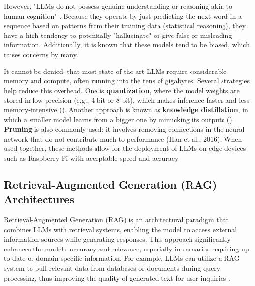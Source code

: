 However, "LLMs do not possess genuine understanding or reasoning akin to human cognition" \cite{li_survey_2024}. Because they operate by just predicting the next word in a sequence based on patterns from their training data (statistical reasoning), they have a high tendency to potentially "hallucinate" or give false or misleading information. Additionally, it is known that these models tend to be biased, which raises concerns by many.

It cannot be denied, that most state-of-the-art LLMs require considerable memory and compute, often running into the tens of gigabytes. Several strategies help reduce this overhead. One is \textbf{quantization}, where the model weights are stored in low precision (e.g., 4-bit or 8-bit), which makes inference faster and less memory-intensive (\cite{dettmers2022optimizers}). Another approach is known as \textbf{knowledge distillation}, in which a smaller model learns from a bigger one by mimicking its outputs (\cite{hinton2015distilling}). \textbf{Pruning} is also commonly used: it involves removing connections in the neural network that do not contribute much to performance (Han et al., 2016). When used together, these methods allow for the deployment of LLMs on edge devices such as Raspberry Pi with acceptable speed and accuracy \cite{zhang-kennedy_systematic_2021}

\subsection{Retrieval-Augmented Generation (RAG) Architectures}
\label{subsec:background:first_section:second_subsection}

Retrieval-Augmented Generation (RAG) is an architectural paradigm that combines LLMs with retrieval systems, enabling the model to access external information sources while generating responses. This approach significantly enhances the model's accuracy and relevance, especially in scenarios requiring up-to-date or domain-specific information. For example, LLMs can utilize a RAG system to pull relevant data from databases or documents during query processing, thus improving the quality of generated text for user inquiries \cite{wang_survey_2024, jeong_adaptive-rag_2024}.


